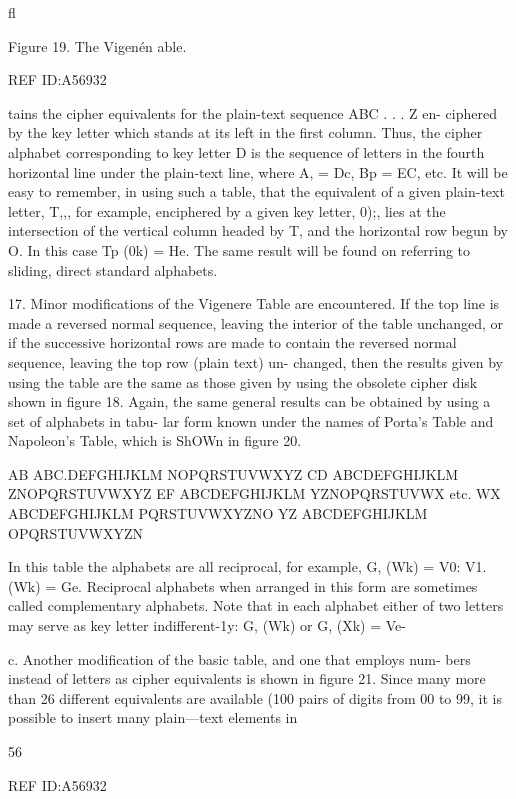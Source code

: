 {ﬂ

Figure 19. The Vigenén able.

 

REF ID:A56932

tains the cipher equivalents for the plain-text sequence ABC . . . Z en-
ciphered by the key letter which stands at its left in the ﬁrst column.
Thus, the cipher alphabet corresponding to key letter D is the sequence
of letters in the fourth horizontal line under the plain-text line, where
A, = Dc, Bp = EC, etc. It will be easy to remember, in using such a
table, that the equivalent of a given plain-text letter, T,,, for example,
enciphered by a given key letter, 0);, lies at the intersection of the vertical
column headed by T, and the horizontal row begun by O. In this case
Tp (0k) = He. The same result will be found on referring to sliding,
direct standard alphabets.

17. Minor modiﬁcations of the Vigenere Table are encountered. If the
top line is made a reversed normal sequence, leaving the interior of the
table unchanged, or if the successive horizontal rows are made to contain
the reversed normal sequence, leaving the top row (plain text) un-
changed, then the results given by using the table are the same as those
given by using the obsolete cipher disk shown in ﬁgure 18. Again, the
same general results can be obtained by using a set of alphabets in tabu-
lar form known under the names of Porta’s Table and Napoleon’s Table,
which is ShOWn in ﬁgure 20.

AB ABC.DEFGHIJKLM
NOPQRSTUVWXYZ
CD ABCDEFGHIJKLM
ZNOPQRSTUVWXYZ
EF ABCDEFGHIJKLM
YZNOPQRSTUVWX
etc.
WX ABCDEFGHIJKLM
PQRSTUVWXYZNO
YZ ABCDEFGHIJKLM
OPQRSTUVWXYZN

In this table the alphabets are all reciprocal, for example, G, (Wk) = V0:
V1. (Wk) = Ge. Reciprocal alphabets when arranged in this form are
sometimes called complementary alphabets. Note that in each alphabet
either of two letters may serve as key letter indifferent-1y: G, (Wk) or
G, (Xk) = Ve-

c. Another modiﬁcation of the basic table, and one that employs num-
bers instead of letters as cipher equivalents is shown in ﬁgure 21. Since
many more than 26 different equivalents are available (100 pairs of
digits from 00 to 99, it is possible to insert many plain—text elements in

56

 

REF ID:A56932

 

}
